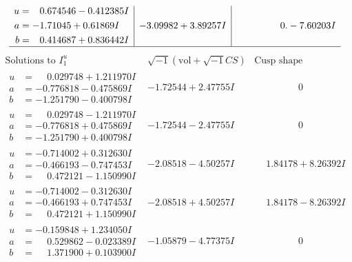 \documentclass[1p]{elsarticle_modified}
\theoremstyle{definition}
\newcommand{\I}{\sqrt{-1}}
\begin{document}
$$\begin{array}{c|c|c}
\begin{aligned}
u &= \phantom{-}0.674546 - 0.412385 I \\
a &= -1.71045 + 0.61869 I \\
b &= \phantom{-}0.414687 + 0.836442 I\end{aligned}
 & -3.09982 + 3.89257 I & \phantom{-0.000000 } 0. - 7.60203 I\\
 \hline 
 \end{array}$$\newpage$$\begin{array}{c|c|c}  
\text{Solutions to }I^u_{1}& \I (\text{vol} + \sqrt{-1}CS) & \text{Cusp shape}\\
 \hline 
\begin{aligned}
u &= \phantom{-}0.029748 + 1.211970 I \\
a &= -0.776818 - 0.475869 I \\
b &= -1.251790 - 0.400798 I\end{aligned}
 & -1.72544 + 2.47755 I & \phantom{-0.000000 } 0 \\ \hline\begin{aligned}
u &= \phantom{-}0.029748 - 1.211970 I \\
a &= -0.776818 + 0.475869 I \\
b &= -1.251790 + 0.400798 I\end{aligned}
 & -1.72544 - 2.47755 I & \phantom{-0.000000 } 0 \\ \hline\begin{aligned}
u &= -0.714002 + 0.312630 I \\
a &= -0.466193 - 0.747453 I \\
b &= \phantom{-}0.472121 - 1.150990 I\end{aligned}
 & -2.08518 - 4.50257 I & \phantom{-}1.84178 + 8.26392 I \\ \hline\begin{aligned}
u &= -0.714002 - 0.312630 I \\
a &= -0.466193 + 0.747453 I \\
b &= \phantom{-}0.472121 + 1.150990 I\end{aligned}
 & -2.08518 + 4.50257 I & \phantom{-}1.84178 - 8.26392 I \\ \hline\begin{aligned}
u &= -0.159848 + 1.234050 I \\
a &= \phantom{-}0.529862 - 0.023389 I \\
b &= \phantom{-}1.371900 + 0.103900 I\end{aligned}
 & -1.05879 - 4.77375 I & \phantom{-0.000000 } 0 \\ \hline\begin{aligned}

\end{aligned}
\end{array}$$
\end{document}
